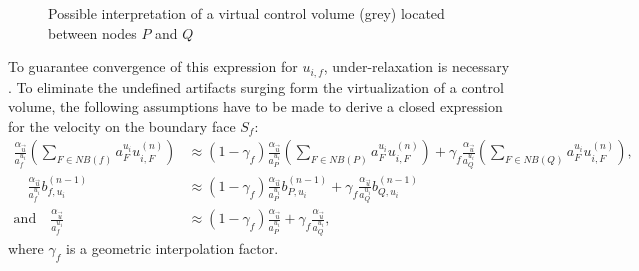 \begin{figure}[h]
  
  \centering{}
  \caption{Possible interpretation of a virtual control volume (grey) located between nodes $P$ and $Q$ }
  \label{fig:virt}
\end{figure}

To guarantee convergence of this expression for \(u_{i,f}\), under-relaxation is necessary \cite{majumdar88}. To eliminate the undefined artifacts surging form the virtualization of a control volume, the following assumptions have to be made to derive a closed expression for the velocity on the boundary face \(S_f\):
\begin{subequations}
\label{eq:approxpwim}
\begin{align}
  \frac{\alpha_{\vec{u}}}{a_f^{u_i}} \left(\sum_{F \in NB(f)} a_F^{u_i} u_{i,F}^{(n)} \right)
  &\approx
  \left(1-\gamma_f\right) \frac{\alpha_{\vec{u}}}{a_P^{u_i}} \left(\sum_{F \in NB(P)} a_F^{u_i} u_{i,F}^{(n)} \right)
  +
  \gamma_f \frac{\alpha_{\vec{u}}}{a_Q^{u_i}} \left(\sum_{F \in NB(Q)} a_F^{u_i} u_{i,F}^{(n)} \right), \\[1em]
  \quad
  \frac{\alpha_{\vec{u}}}{a_f^{u_i}}b_{f,u_i}^{(n-1)} 
  &\approx
  \left(1-\gamma_f\right) \frac{\alpha_{\vec{u}}}{a_P^{u_i}} b_{P,u_i}^{(n-1)} 
  +
  \gamma_f \frac{\alpha_{\vec{u}}}{a_Q^{u_i}} b_{Q,u_i}^{(n-1)} \\[1em]
  \text{and}
  \quad
  \frac{\alpha_{\vec{u}}}{a_f^{u_i}} 
  &\approx
  \left(1-\gamma_f\right) \frac{\alpha_{\vec{u}}}{a_P^{u_i}} 
  +
  \gamma_f \frac{\alpha_{\vec{u}}}{a_Q^{u_i}},
\end{align}
\end{subequations}
where \(\gamma_f\) is a geometric interpolation factor. 

